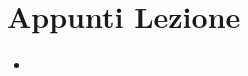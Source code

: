 \documentclass[main.tex]{subfiles}
\begin{document}
\section{Appunti Lezione}

\begin{itemize}
    \item 
\end{itemize}
\end{document}
